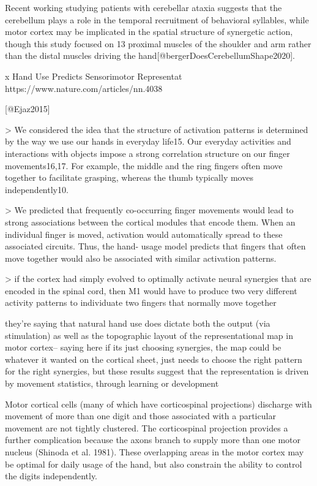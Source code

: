 \documentclass[../main.tex]{subfiles}
\begin{document}
{{ Recent working studying patients with cerebellar ataxia suggests that the cerebellum plays a role in the temporal recruitment of behavioral syllables, while motor cortex may be implicated in the spatial structure of synergetic action, though this study focused on 13 proximal muscles of the shoulder and arm rather than the distal muscles driving the hand[@bergerDoesCerebellumShape2020]. 

 x Hand Use Predicts Sensorimotor Representat
https://www.nature.com/articles/nn.4038

[@Ejaz2015]

> We considered the idea that the structure of activation patterns is determined by the way we use our hands in everyday life15. Our everyday activities and interactions with objects impose a strong correlation structure on our finger movements16,17. For example, the middle and the ring fingers often move together to facilitate grasping, whereas the thumb typically moves independently10.

> We predicted that frequently co-occurring finger movements would lead to strong associations between the cortical modules that encode them. When an individual finger is moved, activation would automatically spread to these associated circuits. Thus, the hand- usage model predicts that fingers that often move together would also be associated with similar activation patterns.

> if the cortex had simply evolved to optimally activate neural synergies that are encoded in the spinal cord, then M1 would have to produce two very different activity patterns to individuate two fingers that normally move together

they're saying that natural hand use does dictate both the output (via stimulation) as well as the topographic layout of the representational map in motor cortex-- saying here if its just choosing synergies, the map could be whatever it wanted on the cortical sheet, just needs to choose the right pattern for the right synergies, but these results suggest that the representation is driven by movement statistics, through learning or development 

Motor cortical cells (many of which have corticospinal projections) discharge with movement of more than one digit and those associated with a particular movement are not tightly clustered. The corticospinal projection provides a further complication because the axons branch to supply more than one motor nucleus (Shinoda et al. 1981). These overlapping areas in the motor cortex may be optimal for daily usage of the hand, but also constrain the ability to control the digits independently. 



}}
\end{document}
